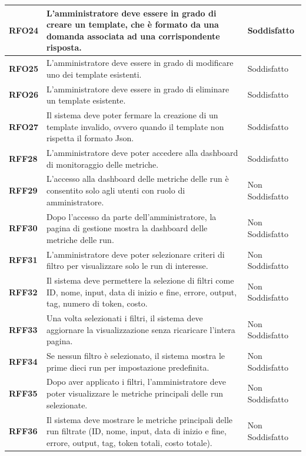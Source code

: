 \begin{longtable}{|>{\centering\arraybackslash}m{}|>{\centering\arraybackslash}m{}|>{\centering\arraybackslash}m{}|}
    \hline
    \textbf{RFO24} & L'amministratore deve essere in grado di creare un template, che è formato da una domanda associata ad una corrispondente risposta. & Soddisfatto \\
    \hline
    \textbf{RFO25} & L'amministratore deve essere in grado di modificare uno dei template esistenti. & Soddisfatto \\
    \hline
    \textbf{RFO26} & L'amministratore deve essere in grado di eliminare un template esistente. & Soddisfatto \\
    \hline
    \textbf{RFO27} & Il sistema deve poter fermare la creazione di un template invalido, ovvero quando il template non rispetta il formato Json. & Soddisfatto \\
    \hline
    \textbf{RFF28} & L'amministratore deve poter accedere alla dashboard di monitoraggio delle metriche. & Soddisfatto \\
    \hline
    \textbf{RFF29} & L’accesso alla dashboard delle metriche delle run è consentito solo agli utenti con ruolo di amministratore. & Non Soddisfatto \\
    \hline
    \textbf{RFF30} & Dopo l’accesso da parte dell'amministratore, la pagina di gestione mostra la dashboard delle metriche delle run. & Non Soddisfatto \\
    \hline
    \textbf{RFF31} & L’amministratore deve poter selezionare criteri di filtro per visualizzare solo le run di interesse. & Non Soddisfatto \\
    \hline
    \textbf{RFF32} & Il sistema deve permettere la selezione di filtri come ID, nome, input, data di inizio e fine, errore, output, tag, numero di token, costo. & Non Soddisfatto \\
    \hline
    \textbf{RFF33} & Una volta selezionati i filtri, il sistema deve aggiornare la visualizzazione senza ricaricare l'intera pagina. & Non Soddisfatto \\
    \hline
    \textbf{RFF34} & Se nessun filtro è selezionato, il sistema mostra le prime dieci run per impostazione predefinita. & Non Soddisfatto \\
    \hline
    \textbf{RFF35} & Dopo aver applicato i filtri, l’amministratore deve poter visualizzare le metriche principali delle run selezionate. & Non Soddisfatto \\
    \hline
    \textbf{RFF36} & Il sistema deve mostrare le metriche principali delle run filtrate (ID, nome, input, data di inizio e fine, errore, output, tag, token totali, costo totale). & Non Soddisfatto \\

\end{longtable}
